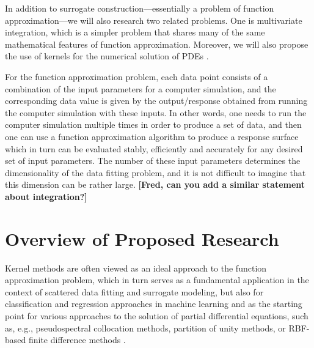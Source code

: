 \documentclass[11pt]{NSFamsart}
\begin{document}
In addition to surrogate construction---essentially a problem of function approximation---we will also research two related problems.  One is multivariate integration, which is a simpler problem that shares many of the same mathematical features of function approximation.  Moreover, we will also propose the use of kernels for the numerical solution of PDEs \citep{ChenEtAl14,FornbergFlyer15,SarraKansa09}. 

For the function approximation problem, each data point consists of a combination of the input parameters for a computer simulation, and the corresponding data value is given by the output/response obtained from running the computer simulation with these inputs. In other words, one needs to run the computer simulation multiple times in order to produce a set of data, and then one can use a function approximation algorithm to produce a response surface which in turn can be evaluated stably, efficiently and accurately for any desired set of input parameters. The number of these input parameters determines the dimensionality of the data fitting problem, and it is not difficult to imagine that this dimension can be rather large. {\bf [Fred, can you add a similar statement about integration?]}

\section{Overview of Proposed Research}
Kernel methods \citep{Fas07a,SchWen06a,Wen05a} are often viewed as an ideal approach to the function approximation problem, which in turn serves as a fundamental application in the context of scattered data fitting and surrogate modeling, but also for classification and regression approaches in machine learning \citep{HasTibFrie01} and as the starting point for various approaches to the solution of partial differential equations, such as, e.g., pseudospectral collocation methods, partition of unity methods, or RBF-based finite difference methods \citep{Fas07a,FornbergFlyer15}.
\end{document}
